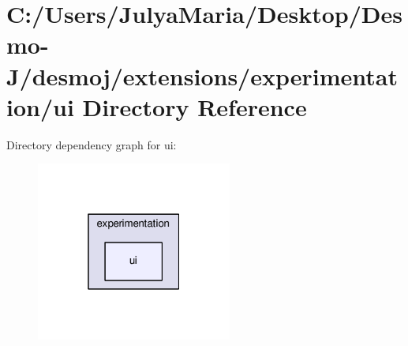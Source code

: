 \section{C\-:/\-Users/\-Julya\-Maria/\-Desktop/\-Desmo-\/\-J/desmoj/extensions/experimentation/ui Directory Reference}
\label{dir_3d62797f69cf3acf946978d602431683}
Directory dependency graph for ui\-:
\nopagebreak
\begin{figure}[H]
\begin{center}
\leavevmode
\includegraphics[width=182pt]{dir_3d62797f69cf3acf946978d602431683_dep}
\end{center}
\end{figure}
